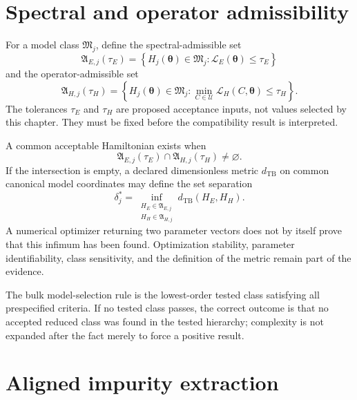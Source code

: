 \section{Spectral and operator admissibility}

For a model class $\mathfrak M_j$, define the spectral-admissible set
\begin{equation}
  \mathfrak A_{E,j}(\tau_E)
  =
  \left\{
    H_j(\boldsymbol\theta)\in\mathfrak M_j:
    \mathcal L_E(\boldsymbol\theta)\leq\tau_E
  \right\}
\end{equation}
and the operator-admissible set
\begin{equation}
  \mathfrak A_{H,j}(\tau_H)
  =
  \left\{
    H_j(\boldsymbol\theta)\in\mathfrak M_j:
    \min_{C\in\mathcal U}\mathcal L_H(C,\boldsymbol\theta)
    \leq\tau_H
  \right\}.
\end{equation}
The tolerances $\tau_E$ and $\tau_H$ are proposed acceptance inputs, not values
selected by this chapter. They must be fixed before the compatibility result is
interpreted.

A common acceptable Hamiltonian exists when
\begin{equation}
  \mathfrak A_{E,j}(\tau_E)
  \cap
  \mathfrak A_{H,j}(\tau_H)
  \neq\varnothing.
\end{equation}
If the intersection is empty, a declared dimensionless metric
$d_{\mathrm{TB}}$ on common canonical model coordinates may define the set
separation
\begin{equation}
  \delta_j^{\ast}
  =
  \inf_{\substack{
    H_E\in\mathfrak A_{E,j}\\
    H_H\in\mathfrak A_{H,j}}}
  d_{\mathrm{TB}}(H_E,H_H).
\end{equation}
A numerical optimizer returning two parameter vectors does not by itself prove
that this infimum has been found. Optimization stability, parameter
identifiability, class sensitivity, and the definition of the metric remain
part of the evidence.

The bulk model-selection rule is the lowest-order tested class satisfying all
prespecified criteria. If no tested class passes, the correct outcome is that
no accepted reduced class was found in the tested hierarchy; complexity is not
expanded after the fact merely to force a positive result.

\section{Aligned impurity extraction}

